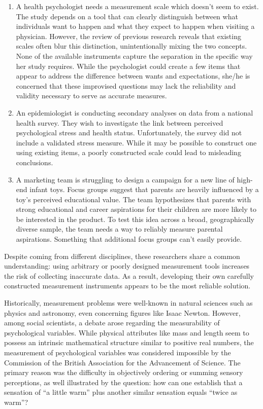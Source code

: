\documentclass[
]{article}
\begin{document}
\begin{enumerate}
\def\labelenumi{\arabic{enumi})}
\item
  A health psychologist needs a measurement scale which doesn't seem to
  exist. The study depends on a tool that can clearly distinguish
  between what individuals want to happen and what they expect to happen
  when visiting a physician. However, the review of previous research
  reveals that existing scales often blur this distinction,
  unintentionally mixing the two concepts. None of the available
  instruments capture the separation in the specific way her study
  requires. While the psychologist could create a few items that appear
  to address the difference between wants and expectations, she/he is
  concerned that these improvised questions may lack the reliability and
  validity necessary to serve as accurate measures.
\item
  An epidemiologist is conducting secondary analyses on data from a
  national health survey. They wish to investigate the link between
  perceived psychological stress and health status. Unfortunately, the
  survey did not include a validated stress measure. While it may be
  possible to construct one using existing items, a poorly constructed
  scale could lead to misleading conclusions.
\item
  A marketing team is struggling to design a campaign for a new line of
  high-end infant toys. Focus groups suggest that parents are heavily
  influenced by a toy's perceived educational value. The team
  hypothesizes that parents with strong educational and career
  aspirations for their children are more likely to be interested in the
  product. To test this idea across a broad, geographically diverse
  sample, the team needs a way to reliably measure parental aspirations.
  Something that additional focus groups can't easily provide.
\end{enumerate}

Despite coming from different disciplines, these researchers share a
common understanding: using arbitrary or poorly designed measurement
tools increases the risk of collecting inaccurate data. As a result,
developing their own carefully constructed measurement instruments
appears to be the most reliable solution.

Historically, measurement problems were well-known in natural sciences
such as physics and astronomy, even concerning figures like Isaac
Newton. However, among social scientists, a debate arose regarding the
measurability of psychological variables. While physical attributes like
mass and length seem to possess an intrinsic mathematical structure
similar to positive real numbers, the measurement of psychological
variables was considered impossible by the Commission of the British
Association for the Advancement of Science. The primary reason was the
difficulty in objectively ordering or summing sensory perceptions, as
well illustrated by the question: how can one establish that a sensation
of ``a little warm'' plus another similar sensation equals ``twice as
warm''?
\end{document}
